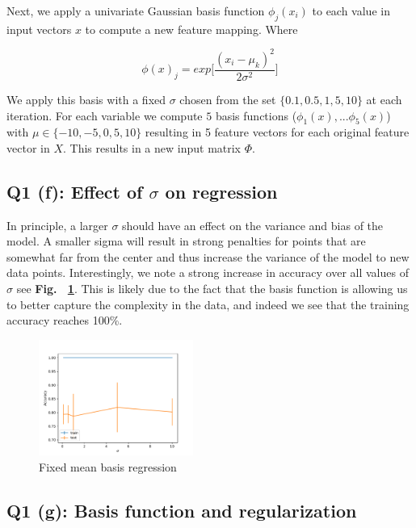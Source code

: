 \documentclass[11pt]{amsart}
\begin{document}
Next, we apply a univariate Gaussian basis function $\phi_j(x_i)$ to each value in input vectors $x$ to compute a new feature mapping. Where

\begin{equation}
	\phi(x)_j = exp\bigg[{\frac{(x_i - \mu_k)^2}{2\sigma^2}}\bigg]
\end{equation}

We apply this basis with a fixed $\sigma$ chosen from the set $\{0.1, 0.5, 1, 5, 10\}$ at each iteration. For each variable we compute $5$ basis functions ($\phi_{1}(x), ... \phi_{5}(x)$) with $\mu \in \{-10, -5, 0, 5, 10\}$ resulting in 5 feature vectors for each original feature vector in $X$. This results in a new input matrix $\Phi$.

\subsection{Q1 (f): Effect of $\sigma$ on regression}

In principle, a larger $\sigma$ should have an effect on the variance and bias of the model. A smaller sigma will result in strong penalties for points that are somewhat far from the center and thus increase the variance of the model to new data points. Interestingly, we note a strong increase in accuracy over all values of $\sigma$ see {\bf Fig. ~\ref{fig:q1f}}. This is likely due to the fact that the basis function is allowing us to better capture the complexity in the data, and indeed we see that the training accuracy reaches 100\%.

\begin{figure}[h!]
	\centering
	\includegraphics[width=0.45\textwidth]{sigmas.pdf}
	\caption{Fixed mean basis regression}
	\label{fig:q1f}
\end{figure}

\subsection{Q1 (g): Basis function and regularization}
\end{document}
